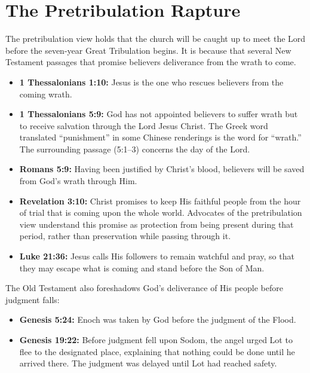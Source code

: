 \section*{The Pretribulation Rapture}

The pretribulation view holds that the church will be caught up to meet the Lord before the seven-year Great Tribulation begins. It is because that several New Testament passages that promise believers deliverance from the wrath to come.

\begin{itemize}
\item \textbf{1 Thessalonians 1:10:} Jesus is the one who rescues believers from the coming wrath.
\item \textbf{1 Thessalonians 5:9:} God has not appointed believers to suffer wrath but to receive salvation through the Lord Jesus Christ. The Greek word translated ``punishment'' in some Chinese renderings is the word for ``wrath.'' The surrounding passage (5:1--3) concerns the day of the Lord.
\item \textbf{Romans 5:9:} Having been justified by Christ's blood, believers will be saved from God's wrath through Him.
\item \textbf{Revelation 3:10:} Christ promises to keep His faithful people from the hour of trial that is coming upon the whole world. Advocates of the pretribulation view understand this promise as protection from being present during that period, rather than preservation while passing through it.
\item \textbf{Luke 21:36:} Jesus calls His followers to remain watchful and pray, so that they may escape what is coming and stand before the Son of Man.
\end{itemize}

The Old Testament also foreshadows God's deliverance of His people before judgment falls:
\begin{itemize}
\item \textbf{Genesis 5:24:} Enoch was taken by God before the judgment of the Flood.
\item \textbf{Genesis 19:22:} Before judgment fell upon Sodom, the angel urged Lot to flee to the designated place, explaining that nothing could be done until he arrived there. The judgment was delayed until Lot had reached safety.
\end{itemize}

